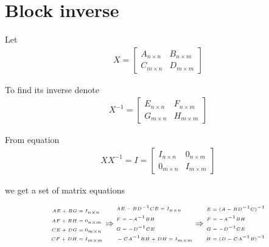 \section{Block inverse}

Let 
\begin{align}
	X = \begin{bmatrix}
		A_{n \times n} & B_{n \times m} \\
		C_{m \times n} & D_{m \times m}
	\end{bmatrix}
\end{align}

To find its inverse denote 
\begin{align}
	X^{-1} = \begin{bmatrix}
		E_{n \times n} & F_{n \times m} \\
		G_{m \times n} & H_{m \times m}
	\end{bmatrix}
\end{align}

From equation 
\begin{align}\label{eq:block_inverse_right}
	X X^{-1} = I = \begin{bmatrix}
		I_{n \times n} & 0_{n \times m} \\
		0_{m \times n} & I_{m \times m}
			\end{bmatrix}
\end{align}

we get a set of matrix equations


\begin{align*}
\begin{tiny}
	\begin{aligned}
	A E + B G &= I_{n \times n} \\
	A F + B H &= 0_{n \times m} \\
	C E + D G &= 0_{m \times n} \\
	C F + D H &= I_{m \times m}
	\end{aligned}
\Rightarrow
	\begin{aligned}
	&A E - B D^{-1} C E = I_{n \times n} \\
	&F = -A^{-1} B H \\
	&G = -D^{-1} C E \\
	&-C A^{-1} B H + D H = I_{m \times m}
	\end{aligned}
\Rightarrow
	\begin{aligned}
	E &= (A - B D^{-1} C)^{-1} \\
	F &= -A^{-1} B H \\
	G &= -D^{-1} C E \\
	H &= (D - C A^{-1} B)^{-1}
	\end{aligned}
\end{tiny}
\end{align*}

